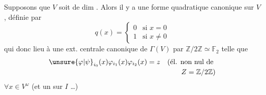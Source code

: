 Supposons que $V$ soit de dim  . Alors
il y a une forme quadratique
canonique sur $V$, définie par
\[
q(x)=\begin{cases}0&\text{si }x=0\\1&\text{si }x\ne0\end{cases}
\]
qui  donc lieu à une ext.
centrale canonique de $\Gamma(V)$ par $\mathbb Z/2\mathbb Z\simeq\mathbb F_2$
telle que
\[
\begin{aligned}
\unsure{\varphi|\psi}_{i_0}(x)\varphi_{i_1}(x)\varphi_{i_2}(x)&=z
\quad\text{(él. non nul de}\\[-2pt]
&\hspace{4.8em}Z=\mathbb Z/2\mathbb Z\text{)}
\end{aligned}
\]
$\forall x\in V^{\omega}$ (et un  
sur $I$ \ldots)
